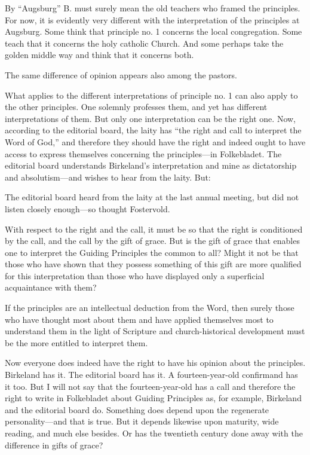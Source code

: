 By “Augsburg” B. must surely mean the old teachers who framed the principles. For now, it is evidently very different with the interpretation of the principles at Augsburg. Some think that principle no. 1 concerns the local congregation. Some teach that it concerns the holy catholic Church. And some perhaps take the golden middle way and think that it concerns both.

The same difference of opinion appears also among the pastors.

What applies to the different interpretations of principle no. 1 can also apply to the other principles. One solemnly professes them, and yet has different interpretations of them. But only one interpretation can be the right one. Now, according to the editorial board, the laity has “the right and call to interpret the Word of God,” and therefore they should have the right and indeed ought to have access to express themselves concerning the principles—in Folkebladet. The editorial board understands Birkeland’s interpretation and mine as dictatorship and absolutism—and wishes to hear from the laity. But:

The editorial board heard from the laity at the last annual meeting, but did not listen closely enough—so thought Fostervold.

With respect to the right and the call, it must be so that the right is conditioned by the call, and the call by the gift of grace. But is the gift of grace that enables one to interpret the Guiding Principles the common to all? Might it not be that those who have shown that they possess something of this gift are more qualified for this interpretation than those who have displayed only a superficial acquaintance with them?

If the principles are an intellectual deduction from the Word, then surely those who have thought most about them and have applied themselves most to understand them in the light of Scripture and church-historical development must be the more entitled to interpret them.

Now everyone does indeed have the right to have his opinion about the principles. Birkeland has it. The editorial board has it. A fourteen-year-old confirmand has it too. But I will not say that the fourteen-year-old has a call and therefore the right to write in Folkebladet about Guiding Principles as, for example, Birkeland and the editorial board do. Something does depend upon the regenerate personality—and that is true. But it depends likewise upon maturity, wide reading, and much else besides. Or has the twentieth century done away with the difference in gifts of grace?


